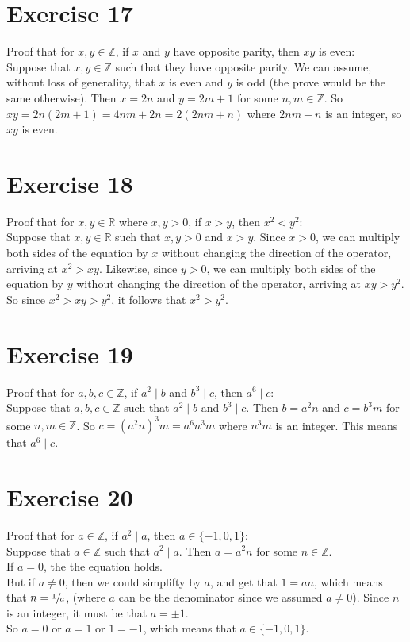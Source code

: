 \documentclass[12pt]{article}
\newcommand{\Z}{\mathbb{Z}}
\newcommand{\R}{\mathbb{R}}
\begin{document}
    \section*{Exercise 17}
    Proof that for $x, y \in \Z$,
    if $x$ and $y$ have opposite parity,
    then $xy$ is even: \\
    Suppose that $x, y \in \Z$
    such that they have opposite parity.
    We can assume, without loss of generality,
    that $x$ is even and $y$ is odd
    (the prove would be the same otherwise). 
    Then $x = 2n$ and $y=2m+1$ for some $n, m \in \Z$.
    So $xy = 2n(2m+1) = 4nm + 2n = 2(2nm + n)$
    where $2nm + n$ is an integer,
    so $xy$ is even. \\

    \section*{Exercise 18}
    Proof that for $x, y \in \R$ where $x, y > 0$,
    if $x > y$,
    then $x^2 < y^2$: \\
    Suppose that $x, y \in \R$
    such that $x, y > 0$ and $x > y$.
    Since $x > 0$,
    we can multiply both sides of the equation by $x$
    without changing the direction of the operator,
    arriving at $x^2 > xy$.
    Likewise, since $y > 0$,
    we can multiply both sides of the equation by $y$
    without changing the direction of the operator,
    arriving at $xy > y^2$.
    So since $x^2 > xy > y^2$,
    it follows that $x^2 > y^2$. \\
   
    \section*{Exercise 19}
    Proof that for $a, b, c \in \Z$,
    if $a^2 \mid b$ and $b^3 \mid c$,
    then $a^6 \mid c$: \\
    Suppose that $a, b, c \in \Z$
    such that $a^2 \mid b$ and $b^3 \mid c$.
    Then $b = a^2n$ and $c = b^3m$ for some $n, m \in \Z$.
    So $c = (a^2n)^3m = a^6n^3m$
    where $n^3m$ is an integer.
    This means that $a^6 \mid c$. \\

    \section*{Exercise 20}
    Proof that for $a \in \Z$,
    if $a^2 \mid a$, 
    then $a \in \{-1, 0, 1\}$: \\
    Suppose that $a \in \Z$
    such that $a^2 \mid a$.
    Then $a = a^2n$ for some $n \in \Z$. \\
    If $a = 0$, the the equation holds. \\
    But if $a \neq 0$,
    then we could simplifty by $a$,
    and get that $1 = an$,
    which means that $n = \sfrac{1}{a}$,
    (where $a$ can be the denominator since we assumed $a \neq 0$).
    Since $n$ is an integer,
    it must be that $a = \pm 1$. \\
    So $a = 0$ or $a = 1$ or $1 = -1$,
    which means that $a \in \{-1, 0, 1\}$. \\
\end{document}

